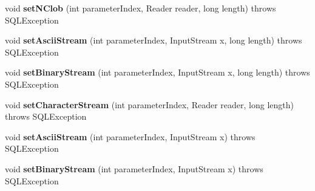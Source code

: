 \begin{DoxyCompactItemize}
\item 
\mbox{\label{classcom_1_1mysql_1_1jdbc_1_1jdbc2_1_1optional_1_1_j_d_b_c4_callable_statement_wrapper_a9adf11039a39987d06de7d08d9e32a97}} 
void {\bfseries set\+N\+Clob} (int parameter\+Index, Reader reader, long length)  throws S\+Q\+L\+Exception 
\item 
\mbox{\label{classcom_1_1mysql_1_1jdbc_1_1jdbc2_1_1optional_1_1_j_d_b_c4_callable_statement_wrapper_a14da67ec84749dcf9af18e76ddb95c46}} 
void {\bfseries set\+Ascii\+Stream} (int parameter\+Index, Input\+Stream x, long length)  throws S\+Q\+L\+Exception 
\item 
\mbox{\label{classcom_1_1mysql_1_1jdbc_1_1jdbc2_1_1optional_1_1_j_d_b_c4_callable_statement_wrapper_a755ca32512bdb189dd1f11cf9ccea1f3}} 
void {\bfseries set\+Binary\+Stream} (int parameter\+Index, Input\+Stream x, long length)  throws S\+Q\+L\+Exception 
\item 
\mbox{\label{classcom_1_1mysql_1_1jdbc_1_1jdbc2_1_1optional_1_1_j_d_b_c4_callable_statement_wrapper_a7120dadb9162c1059898f4ca6be4e6e9}} 
void {\bfseries set\+Character\+Stream} (int parameter\+Index, Reader reader, long length)  throws S\+Q\+L\+Exception 
\item 
\mbox{\label{classcom_1_1mysql_1_1jdbc_1_1jdbc2_1_1optional_1_1_j_d_b_c4_callable_statement_wrapper_ac3e56cfb47effc87b8462c435518401f}} 
void {\bfseries set\+Ascii\+Stream} (int parameter\+Index, Input\+Stream x)  throws S\+Q\+L\+Exception 
\item 
\mbox{\label{classcom_1_1mysql_1_1jdbc_1_1jdbc2_1_1optional_1_1_j_d_b_c4_callable_statement_wrapper_a7236e17bce24e50fb47e0c8129765cd5}} 
void {\bfseries set\+Binary\+Stream} (int parameter\+Index, Input\+Stream x)  throws S\+Q\+L\+Exception 
\item 

\end{DoxyCompactItemize}
